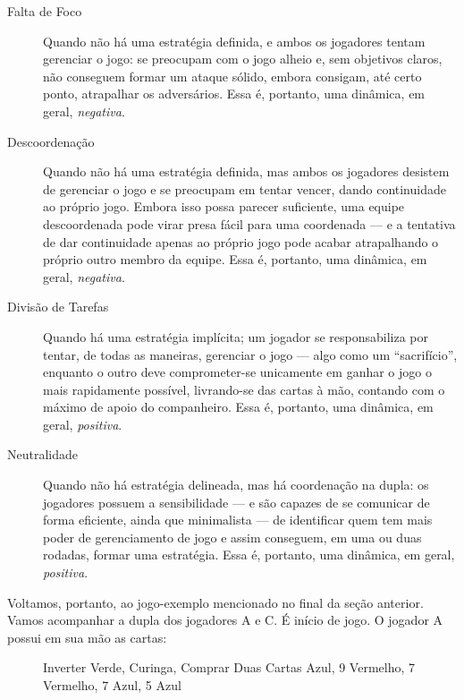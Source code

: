 \begin{description}
\item[Falta de Foco]{Quando não há uma estratégia definida, e ambos os jogadores tentam gerenciar o jogo: se preocupam com o jogo alheio e, sem objetivos claros, não conseguem formar um ataque sólido, embora consigam, até certo ponto, atrapalhar os adversários. Essa é, portanto, uma dinâmica, em geral, \emph{negativa}.}
\item[Descoordenação]{Quando não há uma estratégia definida, mas ambos os jogadores desistem de gerenciar o jogo e se preocupam em tentar vencer, dando continuidade ao próprio jogo. Embora isso possa parecer suficiente, uma equipe descoordenada pode virar presa fácil para uma coordenada --- e a tentativa de dar continuidade apenas ao próprio jogo pode acabar atrapalhando o próprio outro membro da equipe. Essa é, portanto, uma dinâmica, em geral, \emph{negativa}.}
\item[Divisão de Tarefas]{Quando há uma estratégia implícita; um jogador se responsabiliza por tentar, de todas as maneiras, gerenciar o jogo --- algo como um ``sacrifício'', enquanto o outro deve comprometer-se unicamente em ganhar o jogo o mais rapidamente possível, livrando-se das cartas à mão, contando com o máximo de apoio do companheiro. Essa é, portanto, uma dinâmica, em geral, \emph{positiva}.}
\item[Neutralidade]{Quando não há estratégia delineada, mas há coordenação na dupla: os jogadores possuem a sensibilidade --- e são capazes de se comunicar de forma eficiente, ainda que minimalista --- de identificar quem tem mais poder de gerenciamento de jogo e assim conseguem, em uma ou duas rodadas, formar uma estratégia. Essa é, portanto, uma dinâmica, em geral, \emph{positiva}.}
\end{description}

Voltamos, portanto, ao jogo-exemplo mencionado no final da seção anterior. Vamos acompanhar a dupla dos jogadores A e C. É início de jogo. O jogador A possui em sua mão as cartas:

\begin{figure}[!h]
\centering
{}
\caption{Inverter Verde, Curinga, Comprar Duas Cartas Azul, 9 Vermelho, 7 Vermelho, 7 Azul, 5 Azul}
\end{figure}


